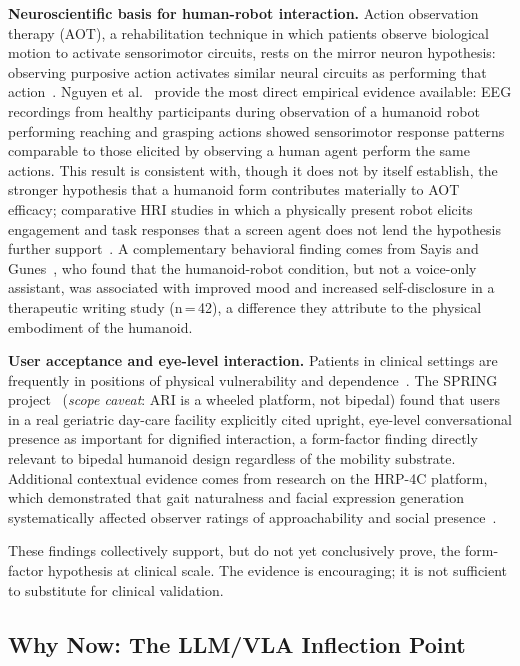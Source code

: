\documentclass[acmsmall]{acmart}
\begin{document}
\textbf{Neuroscientific basis for human-robot interaction.} Action observation
therapy (AOT), a rehabilitation technique in which patients observe biological
motion to activate sensorimotor circuits, rests on the mirror neuron hypothesis:
observing purposive action activates similar neural circuits as performing that
action~\cite{rizzolatti2004mirror}. Nguyen et al.~\cite{nguyen2024eeg} provide the most direct empirical
evidence available: EEG recordings from healthy participants during observation of
a humanoid robot performing reaching and grasping actions showed sensorimotor
response patterns comparable to those elicited by observing a human agent perform
the same actions. This result is consistent with, though it does not by itself
establish, the stronger hypothesis that a humanoid form contributes materially to
AOT efficacy; comparative HRI studies in which a physically present robot elicits
engagement and task responses that a screen agent does not lend the hypothesis
further support~\cite{bainbridge2011benefits,li2015benefit}.
A complementary behavioral finding comes from Sayis and
Gunes~\cite{sayis2024technology}, who found that the humanoid-robot condition,
but not a voice-only assistant, was associated with improved mood and increased
self-disclosure in a therapeutic writing study (n\,=\,42), a difference they
attribute to the physical embodiment of the humanoid.

\textbf{User acceptance and eye-level interaction.} Patients in clinical settings
are frequently in positions of physical vulnerability and
dependence~\cite{gallagher2008dignity,fuseini2022dignity}.
The SPRING
project~\cite{alamedapineda2024spring} (\emph{scope caveat}: ARI is a wheeled
platform, not bipedal) found that users in a real geriatric day-care facility
explicitly cited upright, eye-level conversational presence as important for
dignified interaction, a form-factor finding directly relevant to bipedal
humanoid design regardless of the mobility substrate. Additional contextual
evidence comes from research on the HRP-4C platform, which demonstrated that
gait naturalness and facial expression generation systematically affected observer
ratings of approachability and social presence~\cite{cao2025humanoid}.

These findings collectively support, but do not yet conclusively prove, the
form-factor hypothesis at clinical scale. The evidence is encouraging; it is not
sufficient to substitute for clinical validation.

\subsection{Why Now: The LLM/VLA Inflection Point}
\label{sec:llm}
\end{document}
